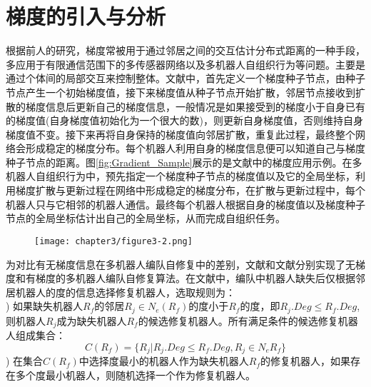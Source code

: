 \section{梯度的引入与分析}
根据前人的研究，梯度常被用于通过邻居之间的交互估计分布式距离的一种手段\supercite{SciencePaper,nagpal2003organizing,stoy2006using,rubenstein2012kilobot,meng2011autonomous,terada2008automatic}，多应用于有限通信范围下的多传感器网络\supercite{nagpal2003organizing}以及多机器人自组织行为\supercite{SciencePaper,stoy2006using}等问题。主要是通过个体间的局部交互来控制整体。文献\parencite{SciencePaper,stoy2006using,rubenstein2012kilobot,terada2008automatic}中，首先定义一个梯度种子节点，由种子节点产生一个初始梯度值，接下来梯度值从种子节点开始扩散，邻居节点接收到扩散的梯度信息后更新自己的梯度信息，一般情况是如果接受到的梯度小于自身已有的梯度值(自身梯度值初始化为一个很大的数)，则更新自身梯度值，否则维持自身梯度值不变。接下来再将自身保持的梯度值向邻居扩散，重复此过程，最终整个网络会形成稳定的梯度分布。每个机器人利用自身的梯度信息便可以知道自己与梯度种子节点的距离。图\ref{fig:Gradient_Sample}展示的是文献\parencite{SciencePaper}中的梯度应用示例。在多机器人自组织行为中，预先指定一个梯度种子节点的梯度值以及它的全局坐标，利用梯度扩散与更新过程在网络中形成稳定的梯度分布，在扩散与更新过程中，每个机器人只与它相邻的机器人通信。最终每个机器人根据自身的梯度值以及梯度种子节点的全局坐标估计出自己的全局坐标，从而完成自组织任务。
\begin{figure}[!htbp]
	\centering
	\texttt{[image: chapter3/figure3-2.png]}
\end{figure}

为对比有无梯度信息在多机器人编队自修复中的差别，文献\parencite{张飞2008移动机器人覆盖问题的研究}和文献\parencite{liu2015gradient}分别实现了无梯度和有梯度的多机器人编队自修复算法。在文献\parencite{张飞2008移动机器人覆盖问题的研究}中，编队中机器人缺失后仅根据邻居机器人的度的信息选择修复机器人，选取规则为：\\
) 如果缺失机器人$R_f$的邻居$R_j \in N_e(R_f)$的度小于$R_f$的度，即$R_j.Deg \leq R_f.Deg$,则机器人$R_j$成为缺失机器人$R_f$的候选修复机器人。所有满足条件的候选修复机器人组成集合：\\
\begin{equation}
	C(R_f) = \{ R_j | R_j.Deg \leq R_f.Deg, R_j \in N_e{R_f} \} 
\end{equation} 
) 在集合$C(R_f)$中选择度最小的机器人作为缺失机器人$R_f$的修复机器人，如果存在多个度最小机器人，则随机选择一个作为修复机器人。\\

